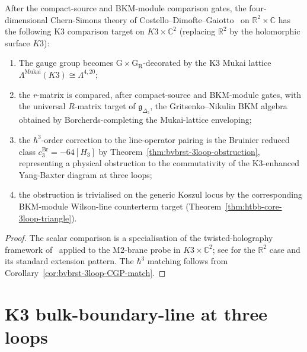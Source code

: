 \begin{corollary}
\label{cor:htbb-4d-CS-K3-3loop}
After the compact-source and BKM-module comparison gates, the
four-dimensional Chern-Simons theory of
Costello--Dimofte--Gaiotto~\cite{CostelloDimofteGaiotto2020} on
$\mathbb{R}^2\times\mathbb{C}$ has the following K3 comparison target
on $K3\times\mathbb{C}^2$ (replacing $\mathbb{R}^2$ by the holomorphic
surface $K3$):
\begin{enumerate}[leftmargin=1.8em]
\item The gauge group becomes
 $\mathrm{G}\times\mathrm{G}_{\mathrm{R}}$-decorated by the K3
 Mukai lattice $\Lambda^{\mathrm{Mukai}}(K3)\cong\Lambda^{4,20}$;
\item the $r$-matrix is compared, after compact-source and BKM-module
 gates, with the universal $R$-matrix target of
 $\mathfrak{g}_{\Delta_5}$, the Gritsenko--Nikulin BKM algebra obtained
 by Borcherds-completing the Mukai-lattice enveloping;
\item the $\hbar^3$-order correction to the line-operator pairing
	 is the Bruinier reduced class $c^{\mathrm{Br}}_3=-64[H_3]$ by
 Theorem~\ref{thm:bvbrst-3loop-obstruction}, representing a
 physical obstruction to the commutativity of the K3-enhanced
 Yang-Baxter diagram at three loops;
\item the obstruction is trivialised on the generic Koszul locus by the
 corresponding BKM-module Wilson-line counterterm target
 (Theorem~\ref{thm:htbb-core-3loop-triangle}).
\end{enumerate}
\end{corollary}

\begin{proof}
The scalar comparison is a specialisation of the
twisted-holography framework of~\cite{Costello2015omega,CostelloGaiottoPaquette2018}
applied to the M$2$-brane probe in $K3\times\mathbb{C}^2$; see
\cite[Thm.~3.1]{CostelloDimofteGaiotto2020} for the $\mathbb{R}^2$
case and its standard extension pattern. The $\hbar^3$ matching
follows from
Corollary~\ref{cor:bvbrst-3loop-CGP-match}.
\end{proof}

\section{K3 bulk-boundary-line at three loops}
\label{sec:htbb-supplement-ii}

